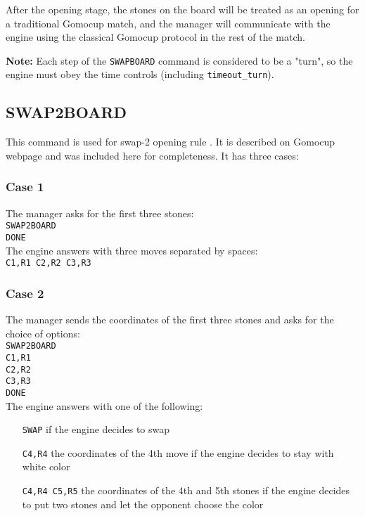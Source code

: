 \documentclass[12pt,a4paper]{article}
\begin{document}
After the opening stage, the stones on the board will be treated as an opening for a traditional Gomocup match, and the manager will communicate with the engine using the classical Gomocup protocol in the rest of the match.

\textbf{Note:} Each step of the \texttt{SWAPBOARD} command is considered to be a "turn", so the engine must obey the time controls (including \texttt{timeout{\_}turn}).


\subsection{SWAP2BOARD}
\label{cmd_swap2board}
This command is used for swap-2 opening rule \cite{renju_opening_rules}. It is described on Gomocup webpage and was included here for completeness. It has three cases:

\subsubsection{Case 1}
The manager asks for the first three stones:\\
\texttt{SWAP2BOARD}\\
\texttt{DONE}\\
The engine answers with three moves separated by spaces:\\
\texttt{C1,R1 C2,R2 C3,R3}

\subsubsection{Case 2}
The manager sends the coordinates of the first three stones and asks for the choice of options:\\
\texttt{SWAP2BOARD}\\
\texttt{C1,R1}\\
\texttt{C2,R2}\\
\texttt{C3,R3}\\
\texttt{DONE}\\
The engine answers with one of the following:
\begin{enumerate}[leftmargin=7.5em]
\item[\texttt{SWAP}]{if the engine decides to swap}
\item[\texttt{C4,R4}]{the coordinates of the 4th move if the engine decides to stay with white color}
\item[\texttt{C4,R4 C5,R5}]{the coordinates of the 4th and 5th stones if the engine decides to put two stones and let the opponent choose the color}
\end{enumerate}
\end{document}
